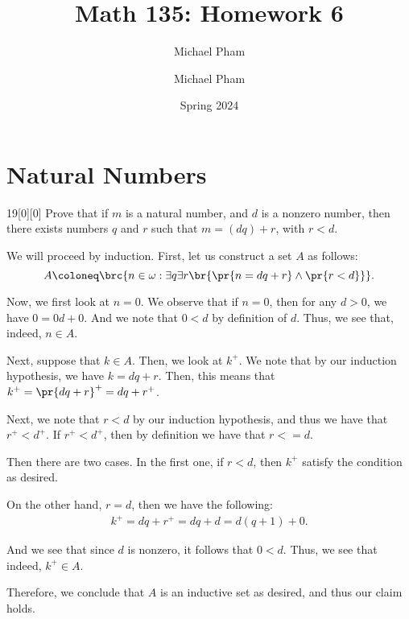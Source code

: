 \documentclass{article}
\title{#1}
\author{Michael Pham}
\date{#2}
\renewcommand{\mytitle}[2]{%
	\title{#1}
	\author{Michael Pham}
	\date{#2}
	\maketitle
	\newpage
	\listoftheorems
	\newpage
}
\begin{document}
\mytitle{Math 135: Homework 6}{Spring 2024}

\setcounter{section}{3}
\section{Natural Numbers}
\begin{hw}{19}[0][0]
	Prove that if $m$ is a natural number, and $d$ is a nonzero number, then there exists numbers $q$ and $r$ such that $m = (dq) + r$, with $r < d$.
\end{hw}
\begin{solution}
	We will proceed by induction. First, let us construct a set $A$ as follows:
	\begin{equation*}
		A \coloneq \brc{n \in \omega : \exists q \exists r \br{ \pr{n = dq + r} \land \pr{r < d}}}.
	\end{equation*}

	Now, we first look at $n = 0$. We observe that if $n = 0$, then for any $d > 0$, we have $0 = 0d + 0$. And we note that $0 < d$ by definition of $d$. Thus, we see that, indeed, $n \in A$.
	
	Next, suppose that $k \in A$. Then, we look at $k^{+}$. We note that by our induction hypothesis, we have $k = dq + r$. Then, this means that $k^{+} = \pr{dq + r}^{+} = dq + r^{+}$.
	
	Next, we note that $r < d$ by our induction hypothesis, and thus we have that $r^{+} < d^{+}$. If $r^{+} < d^{+}$, then by definition we have that $r <= d$.
	
	Then there are two cases. In the first one, if $r < d$, then $k^{+}$ satisfy the condition as desired.
	
	On the other hand, $r = d$, then we have the following:
	\begin{align*}
		k^{+} = dq + r^{+} = dq + d = d(q+1) + 0.
	\end{align*}

	And we see that since $d$ is nonzero, it follows that $0 < d$. Thus, we see that indeed, $k^{+} \in A$.
	
	Therefore, we conclude that $A$ is an inductive set as desired, and thus our claim holds.
\end{solution}
\end{document}
